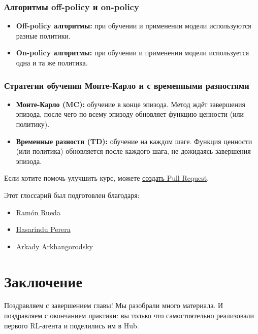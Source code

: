 \documentclass[11pt,a4paper]{article}
\begin{document}
\subsubsection{Алгоритмы off-policy и on-policy}\label{off-policy-vs-on-policy-algorithms}

\begin{itemize}
\tightlist
\item
  \textbf{Off-policy алгоритмы:} при обучении и применении модели используются разные политики.
\item
  \textbf{On-policy алгоритмы:} при обучении и применении модели используется одна и та же политика.
\end{itemize}

\subsubsection{Стратегии обучения Монте-Карло и с временными разностями}\label{monte-carlo-and-temporal-difference-learning-strategies}

\begin{itemize}
\item
  \textbf{Монте-Карло (MC):} обучение в конце эпизода. Метод ждёт завершения эпизода, после чего по всему эпизоду обновляет функцию ценности (или политику).
\item
  \textbf{Временные разности (TD):} обучение на каждом шаге. Функция ценности (или политика) обновляется после каждого шага, не дожидаясь завершения эпизода.
\end{itemize}

Если хотите помочь улучшить курс, можете \href{https://github.com/huggingface/deep-rl-class/pulls}{создать Pull Request}.

Этот глоссарий был подготовлен благодаря:

\begin{itemize}
\tightlist
\item
  \href{https://github.com/ramon-rd}{Ramón Rueda}
\item
  \href{https://github.com/hasarinduperera/}{Hasarindu Perera}
\item
  \href{https://github.com/arkadyark/}{Arkady Arkhangorodsky}
\end{itemize}

\section{Заключение}\label{conclusion}

Поздравляем с завершением главы! Мы разобрали много материала. И поздравляем с окончанием практики: вы только что самостоятельно реализовали первого RL-агента и поделились им в Hub.
\end{document}

